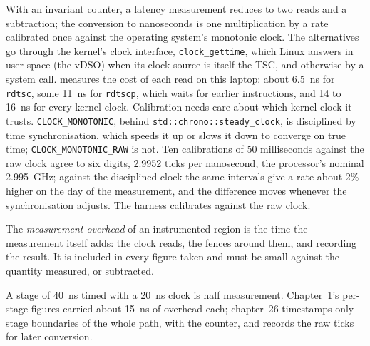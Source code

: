 With an invariant counter, a latency measurement reduces to two reads and a subtraction; the conversion to nanoseconds is
one multiplication by a rate calibrated once against the operating system's monotonic clock. The alternatives go through
the kernel's clock interface, \texttt{clock\_gettime}, which Linux answers in user space (the vDSO) when its clock source
is itself the TSC, and otherwise by a system call.  measures the cost of each read on
this laptop: about \qty{6.5}{\nano\second} for \texttt{rdtsc}, some \qty{11}{\nano\second} for \texttt{rdtscp}, which waits
for earlier instructions, and 14 to \qty{16}{\nano\second} for every kernel clock. Calibration needs care about which kernel clock it trusts. \texttt{CLOCK\_MONOTONIC}, behind \texttt{std::chrono::steady\_clock},
is disciplined by time synchronisation, which speeds it up or slows it down to converge on true time;
\texttt{CLOCK\_MONOTONIC\_RAW} is not. Ten calibrations of 50 milliseconds against the raw clock agree to six digits,
2.9952 ticks per nanosecond, the processor's nominal 2.995~GHz; against the disciplined clock the same intervals give a
rate about 2\% higher on the day of the measurement, and the difference moves whenever the synchronisation adjusts. The harness calibrates against the
raw clock.

\begin{definition}\label{def:ll:measuring-latency:overhead}
The \emph{measurement overhead} of an instrumented region is the time the measurement itself
adds: the clock reads, the fences around them, and recording the result. It is included in every figure taken and must
be small against the quantity measured, or subtracted.
\end{definition}

A stage of \qty{40}{\nano\second} timed with a \qty{20}{\nano\second} clock is half measurement. Chapter~1's per-stage
figures carried about \qty{15}{\nano\second} of overhead each; chapter~26 timestamps only stage boundaries of the whole
path, with the counter, and records the raw ticks for later conversion.

